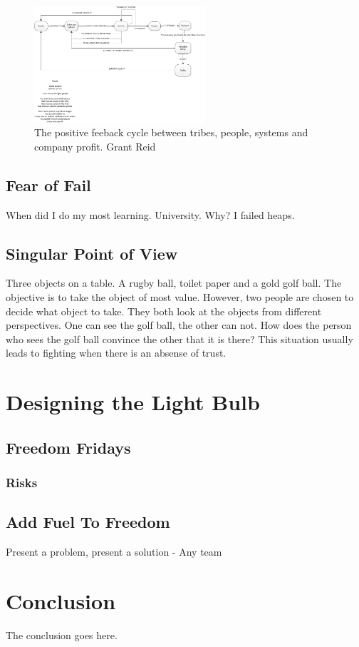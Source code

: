 \documentclass[conference]{IEEEtran}
\begin{document}
\begin{figure}[!h]
\centering
\includegraphics[width=2.5in]{SystemCreation.png}
\caption{The positive feeback cycle between tribes, people, systems and company profit. \textcopyright Grant Reid}
\label{fig:peoplesystems}
\end{figure}


\subsection{Fear of Fail}
When did I do my most learning. University. Why? I failed heaps.



\subsection{Singular Point of View}
Three objects on a table. A rugby ball, toilet paper and a gold golf ball. The objective is to take the object of most value. However, two people are chosen to decide what object to take. They both look at the objects from different perspectives. One can see the golf ball, the other can not. How does the person who sees the golf ball convince the other that it is there? This situation usually leads to fighting when there is an absense of trust. 

\section{Designing the Light Bulb}

\subsection{Freedom Fridays}

\subsubsection{Risks}

\subsection{Add Fuel To Freedom}
Present a problem, present a solution - Any team

\section{Conclusion}
The conclusion goes here.
\end{document}
